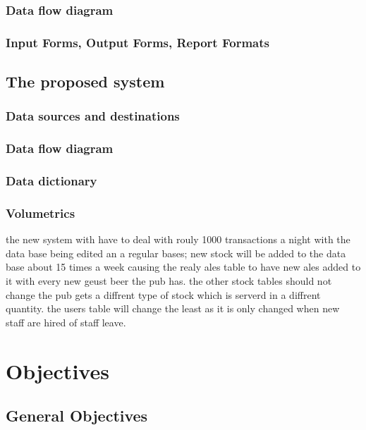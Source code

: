 \subsubsection{Data flow diagram}

\subsubsection{Input Forms, Output Forms, Report Formats}

\subsection{The proposed system}

\subsubsection{Data sources and destinations}

\subsubsection{Data flow diagram}

\subsubsection{Data dictionary}

\subsubsection{Volumetrics}

 the new system with have to deal with rouly 1000 transactions a night with the data base being edited an a regular bases; new stock will be added to the data base about 15 times a week causing the realy ales table to have new ales added to it with every new geust beer the pub has. the other stock tables should not change the pub gets a diffrent type of stock which is serverd in a diffrent quantity. the users table will change the least as it is only changed when new staff are hired of staff leave.

\section{Objectives}

\subsection{General Objectives}


